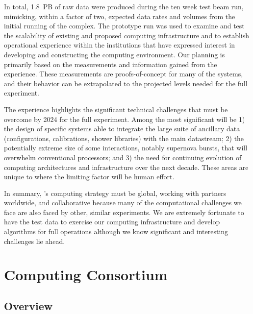 In total, \SI{1.8}{PB} of raw data were produced during the ten week test beam run, mimicking, within a factor of two, expected data rates and volumes from the initial running of the  complex.  The prototype run was used to examine and test the scalability of existing and proposed computing infrastructure and to establish operational experience within the institutions that have expressed interest in developing and constructing the  computing environment.  Our planning is primarily based on the measurements and information gained from the  experience.   These measurements are proofs-of-concept for many of the systems, and their behavior can be extrapolated to the projected levels needed for the full  experiment. 


The  experience highlights the significant technical challenges that must be overcome by 2024 for the full experiment. Among the most significant will be  1) the design of  specific systems able to integrate the large suite of ancillary data (configurations, calibrations, shower libraries) with the main  datastream; 2) the potentially extreme size of some interactions, notably supernova bursts, that will overwhelm conventional processors; and 3) the need for continuing evolution of computing architectures and infrastructure over the next decade. These  areas are unique to  where the limiting factor will be human effort. 

In summary, 's computing strategy must be global, working with partners worldwide, and collaborative because many of the computational challenges we face are also %
faced by other, similar experiments.  We are extremely fortunate to have the  test data to exercise our computing infrastructure and develop algorithms for  full  operations although we know significant and interesting challenges lie ahead. 
 
 
\section{Computing Consortium}
\subsection{Overview}
\label{ch:exec-comp-ovr}


